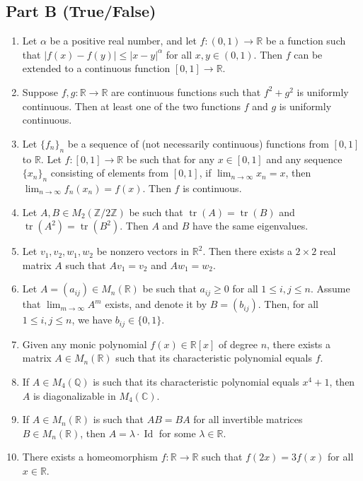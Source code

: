 \documentclass[11pt, a4paper]{article}
\begin{document}
\subsection*{Part B (True/False)}
\begin{enumerate}
  \item Let $\alpha$ be a positive real number, and let $f: (0,1) \to \mathbb{R}$ be a function such that $|f(x) - f(y)| \le |x - y|^\alpha$ for all $x, y \in (0,1)$. Then $f$ can be extended to a continuous function $[0,1] \to \mathbb{R}$.
  \item Suppose $f, g: \mathbb{R} \to \mathbb{R}$ are continuous functions such that $f^2 + g^2$ is uniformly continuous. Then at least one of the two functions $f$ and $g$ is uniformly continuous.
  \item Let $\{f_n\}_n$ be a sequence of (not necessarily continuous) functions from $[0,1]$ to $\mathbb{R}$. Let $f: [0,1] \to \mathbb{R}$ be such that for any $x \in [0,1]$ and any sequence $\{x_n\}_n$ consisting of elements from $[0,1]$, if $\lim_{n \to \infty} x_n = x$, then $\lim_{n \to \infty} f_n(x_n) = f(x)$. Then $f$ is continuous.
  \item Let $A, B \in M_2(\mathbb{Z}/2\mathbb{Z})$ be such that $\operatorname{tr}(A) = \operatorname{tr}(B)$ and $\operatorname{tr}(A^2) = \operatorname{tr}(B^2)$. Then $A$ and $B$ have the same eigenvalues.
  \item Let $v_1, v_2, w_1, w_2$ be nonzero vectors in $\mathbb{R}^2$. Then there exists a $2 \times 2$ real matrix $A$ such that $Av_1 = v_2$ and $Aw_1 = w_2$.
  \item Let $A = (a_{ij}) \in M_n(\mathbb{R})$ be such that $a_{ij} \ge 0$ for all $1 \le i, j \le n$. Assume that $\lim_{m \to \infty} A^m$ exists, and denote it by $B = (b_{ij})$. Then, for all $1 \le i, j \le n$, we have $b_{ij} \in \{0, 1\}$.
  \item Given any monic polynomial $f(x) \in \mathbb{R}[x]$ of degree $n$, there exists a matrix $A \in M_n(\mathbb{R})$ such that its characteristic polynomial equals $f$.
  \item If $A \in M_4(\mathbb{Q})$ is such that its characteristic polynomial equals $x^4 + 1$, then $A$ is diagonalizable in $M_4(\mathbb{C})$.
  \item If $A \in M_n(\mathbb{R})$ is such that $AB = BA$ for all invertible matrices $B \in M_n(\mathbb{R})$, then $A = \lambda \cdot \operatorname{Id}$ for some $\lambda \in \mathbb{R}$.
  \item There exists a homeomorphism $f: \mathbb{R} \to \mathbb{R}$ such that $f(2x) = 3f(x)$ for all $x \in \mathbb{R}$.

\end{enumerate}
\end{document}
